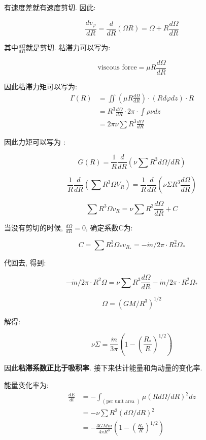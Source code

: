 \documentclass[fontset=windows]{report}
\begin{document}
有速度差就有速度剪切. 因此:

\[\frac{d v_{\varphi}}{dR}=\frac d {dR}(\Omega R)=\Omega+R\frac{d\Omega}{dR}\]

其中\(\frac{d\Omega}{dR}\)就是剪切. 粘滞力可以写为:

\[\text{viscous force}=\mu R\frac{d\Omega}{dR}\]

因此粘滞力矩可以写为:
\begin{equation}
  \begin{aligned}
    \Gamma(R) 
    &=\iint\left(\mu R \frac{d \Omega}{d R}\right) \cdot(R d \varphi d z) \cdot R \\
    &=R^{3} \frac{d \Omega}{d R} \cdot 2 \pi \cdot \int \rho \nu d z \\
    &=2 \pi \nu \sum R^{3} \frac{d \Omega}{d R}
  \end{aligned}
\end{equation}

因此力矩可以写为 :

\[G(R)=\frac{1}{R} \frac{d}{d R}\left(\nu \sum R^{3} d \Omega / d R\right)\]

\[\frac{1}{R} \frac{d}{d R}\left(\sum R^{3} \Omega V_{R}\right)=\frac{1}{R} \frac{d}{d R}\left(\nu \Sigma R^{3} \frac{d \Omega}{d R}\right)\]

\[\sum R^{3} \Omega v_{R}=\nu \sum R^{3}\frac{d \Omega}{d R}+C\]

当没有剪切的时候, \(\frac{d \Omega}{d R}=0\), 确定系数C为:

\[C=\sum R_{*}^{3} \Omega_{*} v_{R_{*}}=-\dot{m} / 2 \pi \cdot R_{*}^{2} \Omega_{*}\]

代回去, 得到:

\[-\dot{m} / 2 \pi \cdot R^{2} \Omega=\nu \sum R^{3} \frac{d \Omega}{d R}-\dot{m} / 2 \pi \cdot R_{*}^{2} \Omega_{*}\]

\[\Omega=\left(G M / R^{3}\right)^{1 / 2}\]

解得:

\[\nu \Sigma=\frac{\dot m}{3 \pi}\left(1-\left(\frac{R_{*}}{R}\right)^{1 / 2}\right)\]

因此\textbf{粘滞系数正比于吸积率}. 接下来估计能量和角动量的变化率.

能量变化率为:
\begin{equation}
  \begin{aligned}
    \frac{d E}{d t} 
    &=-\int_{(\text {per unit area })}\mu(Rd\Omega/dR)^2dz 
    \\&=-\nu \sum R^{2}(d \Omega / d R)^{2} 
    \\&=-\frac{3 G M \dot{m}}{4 \pi R^{3}}\left(1-\left(\frac{R_{*}}{R}\right)^{1 / 2}\right)
    \end{aligned}
\end{equation}
\end{document}
